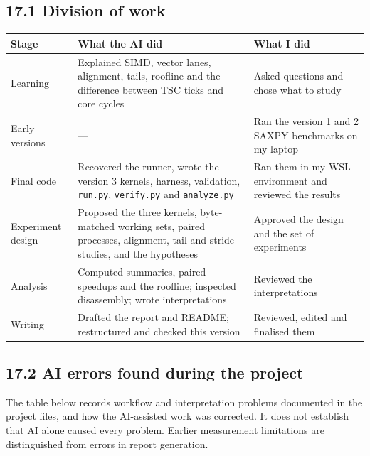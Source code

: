 \documentclass[10pt,letterpaper]{article}
\begin{document}
\subsection*{17.1 Division of work}

{\footnotesize\begin{longtable}{>{\raggedright\arraybackslash}p{0.1458\dimexpr\linewidth-6\tabcolsep\relax}>{\raggedright\arraybackslash}p{0.4444\dimexpr\linewidth-6\tabcolsep\relax}>{\raggedright\arraybackslash}p{0.4097\dimexpr\linewidth-6\tabcolsep\relax}}\toprule
\textbf{Stage} & \textbf{What the AI did} & \textbf{What I did} \\ \midrule\endhead
Learning & Explained SIMD, vector lanes, alignment, tails, roofline and the difference between TSC ticks and core cycles & Asked questions and chose what to study \\
Early versions & --- & Ran the version 1 and 2 SAXPY benchmarks on my laptop \\
Final code & Recovered the runner, wrote the version 3 kernels, harness, validation, \texttt{run.py}, \texttt{verify.py} and \texttt{analyze.py} & Ran them in my WSL environment and reviewed the results \\
Experiment design & Proposed the three kernels, byte-matched working sets, paired processes, alignment, tail and stride studies, and the hypotheses & Approved the design and the set of experiments \\
Analysis & Computed summaries, paired speedups and the roofline; inspected disassembly; wrote interpretations & Reviewed the interpretations \\
Writing & Drafted the report and README; restructured and checked this version & Reviewed, edited and finalised them \\
\bottomrule\end{longtable}}

\subsection*{17.2 AI errors found during the project}

The table below records workflow and interpretation problems documented in the project files, and how the AI-assisted work was corrected. It does not establish that AI alone caused every problem. Earlier measurement limitations are distinguished from errors in report generation.
\end{document}
